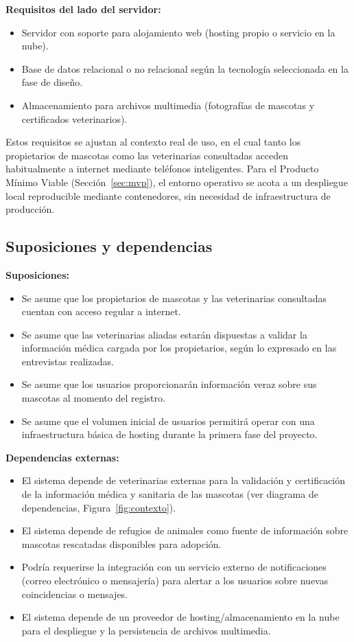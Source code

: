 \documentclass[journal,onecolumn]{IEEEtran}
\begin{document}
	\textbf{Requisitos del lado del servidor:}
	\begin{itemize}[leftmargin=*]
		\item Servidor con soporte para alojamiento web (hosting propio o servicio en la nube).
		\item Base de datos relacional o no relacional según la tecnología seleccionada en la fase de diseño.
		\item Almacenamiento para archivos multimedia (fotografías de mascotas y certificados veterinarios).
	\end{itemize}
	
	Estos requisitos se ajustan al contexto real de uso, en el cual tanto los
	propietarios de mascotas como las veterinarias consultadas acceden
	habitualmente a internet mediante teléfonos inteligentes. Para el Producto
	Mínimo Viable (Sección~\ref{sec:mvp}), el entorno operativo se acota a un
	despliegue local reproducible mediante contenedores, sin necesidad de
	infraestructura de producción.
	
	\subsection{Suposiciones y dependencias}
	\label{sec:suposiciones}
	
	\textbf{Suposiciones:}
	\begin{itemize}[leftmargin=*]
		\item Se asume que los propietarios de mascotas y las veterinarias consultadas cuentan con acceso regular a internet.
		\item Se asume que las veterinarias aliadas estarán dispuestas a validar la información médica cargada por los propietarios, según lo expresado en las entrevistas realizadas.
		\item Se asume que los usuarios proporcionarán información veraz sobre sus mascotas al momento del registro.
		\item Se asume que el volumen inicial de usuarios permitirá operar con una infraestructura básica de hosting durante la primera fase del proyecto.
	\end{itemize}
	
	\textbf{Dependencias externas:}
	\begin{itemize}[leftmargin=*]
		\item El sistema depende de veterinarias externas para la validación y certificación de la información médica y sanitaria de las mascotas (ver diagrama de dependencias, Figura~\ref{fig:contexto}).
		\item El sistema depende de refugios de animales como fuente de información sobre mascotas rescatadas disponibles para adopción.
		\item Podría requerirse la integración con un servicio externo de notificaciones (correo electrónico o mensajería) para alertar a los usuarios sobre nuevas coincidencias o mensajes.
		\item El sistema depende de un proveedor de hosting/almacenamiento en la nube para el despliegue y la persistencia de archivos multimedia.
	\end{itemize}
	
\end{document}
